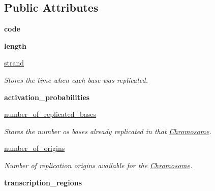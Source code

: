 \subsection*{Public Attributes}
\begin{DoxyCompactItemize}
\item 
\mbox{\label{classReDyMo_1_1src_1_1chromosome_1_1Chromosome_abdbb8d3dd6cd16474a044a7d33e5f674}} 
{\bfseries code}
\item 
\mbox{\label{classReDyMo_1_1src_1_1chromosome_1_1Chromosome_ac53ec626e86706cfc4d5ee66ecb49c0d}} 
{\bfseries length}
\item 
\mbox{\hyperlink{classReDyMo_1_1src_1_1chromosome_1_1Chromosome_ad6b5e4f18b081ac4cf8271d1ec216141}{strand}}
\begin{DoxyCompactList}\small\item\em Stores the time when each base was replicated. \end{DoxyCompactList}\item 
\mbox{\label{classReDyMo_1_1src_1_1chromosome_1_1Chromosome_a53c0e03a5e99b3e93ef03134de6a9222}} 
{\bfseries activation\+\_\+probabilities}
\item 
\mbox{\hyperlink{classReDyMo_1_1src_1_1chromosome_1_1Chromosome_a0ce8da5c0773f1d5d6e668b26d498875}{number\+\_\+of\+\_\+replicated\+\_\+bases}}
\begin{DoxyCompactList}\small\item\em Stores the number os bases already replicated in that \mbox{\hyperlink{classReDyMo_1_1src_1_1chromosome_1_1Chromosome}{Chromosome}}. \end{DoxyCompactList}\item 
\mbox{\hyperlink{classReDyMo_1_1src_1_1chromosome_1_1Chromosome_ab8d8356cc5954967b754feb3c5da8c16}{number\+\_\+of\+\_\+origins}}
\begin{DoxyCompactList}\small\item\em Number of replication origins available for the \mbox{\hyperlink{classReDyMo_1_1src_1_1chromosome_1_1Chromosome}{Chromosome}}. \end{DoxyCompactList}\item 
\mbox{\label{classReDyMo_1_1src_1_1chromosome_1_1Chromosome_a32067e4ed445a5d5b425cca7bb9f7f9d}} 
{\bfseries transcription\+\_\+regions}
\end{DoxyCompactItemize}


